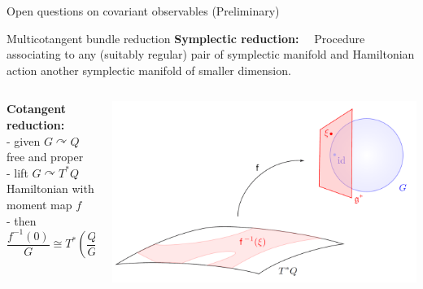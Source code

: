\documentclass[handout,10pt]{beamer}
\renewcommand{\action}{\curvearrowright}
\begin{document}
\begin{frame}{Open questions on covariant observables (Preliminary)}
\end{frame}



\begin{frame}{Multicotangent bundle reduction}
	\textbf{\color{UniGreen}Symplectic reduction:}~~
	 Procedure associating to any (suitably regular) pair of symplectic manifold and Hamiltonian action another symplectic manifold of smaller dimension.
	\vfill
	\pause

	\begin{columns}
		\begin{column}{0.65\textwidth}
				\textbf{\color{UniGreen}Cotangent reduction:}~~
				\\- given $G\action Q$ free and proper
				\\- lift $G\action T^\ast Q$ Hamiltonian with moment map $f$
				\\- then $$ \frac{f^{-1}(0)}{G}\cong T^\ast(\frac{Q}{G})~.$$
		\end{column}	
		\begin{column}{0.350\textwidth}
			\includegraphics[width=\textwidth]{./Pictures/Reduction}
		\end{column}	
	\end{columns}	
	\vfill
	\pause
	

\end{frame}
\end{document}
